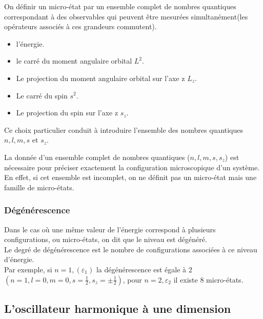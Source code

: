 \documentclass[12pt,oneside]{book}
\begin{document}
\begin{itemize}
\begin{itemize}
	      \end{itemize}
	      On définir un micro-état par un ensemble complet de nombres quantiques correspondant à des observables qui peuvent être mesurées simultanément(les opérateurs associés à ces grandeurs commutent).
	      \begin{itemize}
		      \item l'énergie.
		      \item le carré du moment angulaire orbital $L^2$.
		      \item Le projection du moment angulaire orbital sur l'axe z $L_z$.
		      \item Le carré du spin $s^2$.
		      \item Le projection du spin sur l'axe z $s_z$.
	      \end{itemize}
	      Ce choix particulier conduit à introduire l'ensemble des nombres quantiques $n, l, m, s $ et $ s_z$.
\end{itemize}
La donnée d'un ensemble complet de nombres quantiques ($n,l,m,s,s_z$) est nécessaire pour préciser exactement la configuration microscopique d'un système.\\
En effet, si cet ensemble est incomplet, on ne définit pas un micro-état mais une famille de micro-états.
\subsubsection{Dégénérescence}
Dans le cas où une même valeur de l'énergie correspond à plusieurs configurations, ou micro-états, on dit que le niveau est dégénéré.\\
Le degré de dégénérescence est le nombre de configurations associées à ce niveau d'énergie.\\
Par exemple, si $n =1,(\varepsilon_1)$  la dégénérescence est égale à 2 $(n = 1, l = 0, m = 0, s = \frac{1}{2} , s_z = \pm \frac{1}{2} )$, pour $n=2,\varepsilon_2$ il existe 8 micro-états.\\
\subsection{L'oscillateur harmonique à une dimension}
\end{document}
